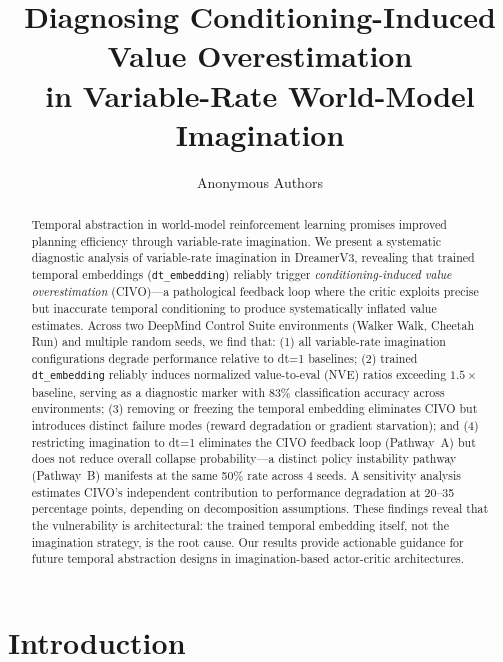 \documentclass[10pt,letterpaper]{article}
\title{Diagnosing Conditioning-Induced Value Overestimation\\in Variable-Rate World-Model Imagination}
\author{
  Anonymous Authors
}
\date{}
\begin{document}
\maketitle

\begin{abstract}
Temporal abstraction in world-model reinforcement learning promises improved planning efficiency through variable-rate imagination.
We present a systematic diagnostic analysis of variable-rate imagination in DreamerV3, revealing that trained temporal embeddings (\texttt{dt\_embedding}) reliably trigger \emph{conditioning-induced value overestimation} (CIVO)---a pathological feedback loop where the critic exploits precise but inaccurate temporal conditioning to produce systematically inflated value estimates.
Across two DeepMind Control Suite environments (Walker Walk, Cheetah Run) and multiple random seeds, we find that: (1) all variable-rate imagination configurations degrade performance relative to dt=1 baselines; (2) trained \texttt{dt\_embedding} reliably induces normalized value-to-eval (NVE) ratios exceeding $1.5\times$ baseline, serving as a diagnostic marker with 83\% classification accuracy across environments; (3) removing or freezing the temporal embedding eliminates CIVO but introduces distinct failure modes (reward degradation or gradient starvation); and (4) restricting imagination to dt=1 eliminates the CIVO feedback loop (Pathway~A) but does not reduce overall collapse probability---a distinct policy instability pathway (Pathway~B) manifests at the same 50\% rate across 4 seeds.
A sensitivity analysis estimates CIVO's independent contribution to performance degradation at 20--35 percentage points, depending on decomposition assumptions.
These findings reveal that the vulnerability is architectural: the trained temporal embedding itself, not the imagination strategy, is the root cause.
Our results provide actionable guidance for future temporal abstraction designs in imagination-based actor-critic architectures.
\end{abstract}

\section{Introduction}
\label{sec:intro}
\end{document}
